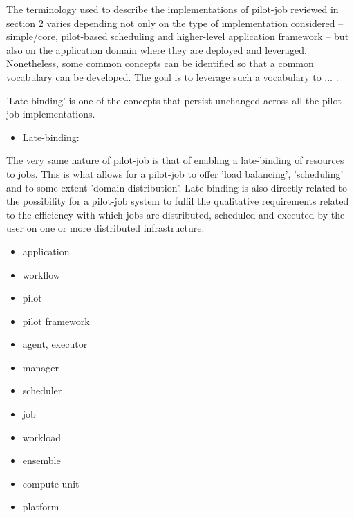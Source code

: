 \documentclass{sig-alternate}
\begin{document}

The terminology used to describe the implementations of pilot-job reviewed in
section 2 varies depending not only on the type of implementation considered --
simple/core, pilot-based scheduling and higher-level application framework --
but also on the application domain where they are deployed and leveraged.
Nonetheless, some common concepts can be identified so that a common vocabulary
can be developed. The goal is to leverage such a vocabulary to ...
.

'Late-binding' is one of the concepts that persist unchanged across all the
pilot-job implementations. 
\begin{itemize}
        \item Late-binding: 
\end{itemize}

The very same nature of pilot-job is that of enabling a late-binding of
resources to jobs. This is what allows for a pilot-job to offer 'load
balancing', 'scheduling' and to some extent 'domain distribution'. Late-binding
is also directly related to the possibility for a pilot-job system to fulfil
the qualitative requirements related to the efficiency with which jobs are
distributed, scheduled and executed by the user on one or more distributed
infrastructure. 

\begin{itemize}
	\item application
	\item workflow
        \item pilot
        \item pilot framework
        \item agent, executor
	\item manager
        \item scheduler
	\item job
        \item workload
	\item ensemble
    \item compute unit
	\item platform
\end{itemize}

\newpage
\end{document}
